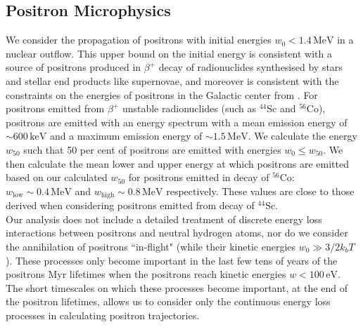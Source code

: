 \documentclass[a4paper,fleqn,usenatbib]{mnras}
\begin{document}
\subsection{Positron Microphysics}
We consider the propagation of positrons with initial energies $w_0<1.4\,\mathrm{MeV}$ in a nuclear outflow. This upper bound on the initial energy is consistent with a source of positrons produced in $\beta^+$ decay of radionuclides synthesised by stars and stellar end products like supernovae, and moreover is consistent with the constraints on the energies of positrons in the Galactic center from \cite{Beacom06}. For positrons emitted from $\beta^+$ unstable radionuclides (such as $^{44}$Sc and $^{56}$Co), positrons are emitted with an energy spectrum with a mean emission energy of $\sim600\,\mathrm{keV}$ and a maximum emission energy of $\sim1.5\,\mathrm{MeV}$. We calculate the energy $w_{50}$ such that 50 per cent of positrons are emitted with energies $w_{0}\leq w_{50}$. We then calculate the mean lower and upper energy at which positrons are emitted based on our calculated $w_{50}$ for positrons emitted in decay of $^{56}$Co: $w_\mathrm{low} \sim 0.4 \,\mathrm{MeV}$ and $w_\mathrm{high}\sim 0.8\,\mathrm{MeV}$ respectively. These values are close to those derived when considering positrons emitted from decay of $^{44}$Sc.\\
Our analysis does not include a detailed treatment of discrete energy loss interactions between positrons and neutral hydrogen atoms, nor do we consider the annihilation of positrons ``in-flight" (while their kinetic energies $w_0\gg 3/2 k_b T$). These processes only become important in the last few tens of years of the positrons Myr lifetimes when the positrons reach kinetic energies $w<100\,\mathrm{eV}$. The short timescales on which these processes become important, at the end of the positron lifetimes, allows us to consider only the continuous energy loss processes in calculating positron trajectories.\\
\end{document}

